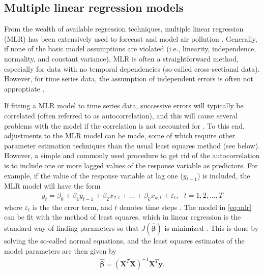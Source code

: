 \subsection{Multiple linear regression models}
From the wealth of available regression techniques, multiple linear regression (MLR) has been extensively used to forecast and model air pollution \cite{atmos7020015}. Generally, if none of the basic model assumptions are violated (i.e., linearity, independence, normality, and constant variance), MLR is often a straightforward method, especially for data with no temporal dependencies (so-called cross-sectional data). However, for time series data, the assumption of independent errors is often not approptiate \cite{Montgomery2015}. 

If fitting a MLR model to time series data, successive errors will typically be correlated (often referred to as autocorrelation), and this will cause several problems with the model if the correlation is not accounted for \cite{Montgomery2015}. To this end, adjustments to the MLR model can be made, some of which require other parameter estimation techniques than the usual least squares method (see below). However, a simple and commonly used procedure to get rid of the autocorrelation is to include one or more lagged values of the response variable as predictors. For example, if the value of the response variable at lag one ($y_{t-1}$) is included, the MLR model will have the form 
\begin{align}
y_t = \beta_0 + \beta_{1} y_{t-1} + \beta_2 x_{2,t} + ... + \beta_{k} x_{k,t} + \varepsilon_t, \: \: \: t = 1, 2, ..., T
\label{eq:mlr}
\end{align}
where $\varepsilon_t$ is the the error term, and $t$ denotes time steps \cite{Montgomery2015}. The model in \cref{eq:mlr} can be fit with the method of least squares, which in linear regression is the standard way of finding parameters so that $J(\bm{\hat{\beta}})$ is minimized \cite{Montgomery2012}. This is done by solving the so-called normal equations,
and the least squares estimates of the model parameters are then given by
\begin{align}
\bm{\hat{\beta}} = (\bm{X}^T\bm{X})^{-1}\bm{X}^T\bm{y}.
\label{eq:normal_sol} 
\end{align}

